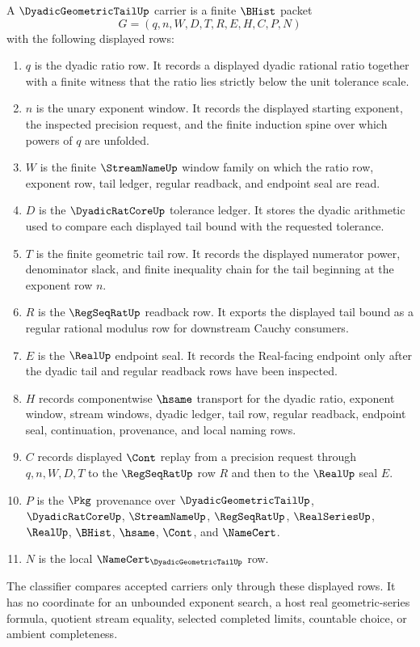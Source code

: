 \begin{definition}
\label{def:dyadic-geometric-tail-carrier}
A $\DyadicGeometricTailUp$ carrier is a finite $\BHist$ packet
$$
G=(q,n,W,D,T,R,E,H,C,P,N)
$$
with the following displayed rows:
\begin{enumerate}
\item $q$ is the dyadic ratio row. It records a displayed dyadic rational ratio together with a finite witness that the ratio lies strictly below the unit tolerance scale.
\item $n$ is the unary exponent window. It records the displayed starting exponent, the inspected precision request, and the finite induction spine over which powers of $q$ are unfolded.
\item $W$ is the finite $\StreamNameUp$ window family on which the ratio row, exponent row, tail ledger, regular readback, and endpoint seal are read.
\item $D$ is the $\DyadicRatCoreUp$ tolerance ledger. It stores the dyadic arithmetic used to compare each displayed tail bound with the requested tolerance.
\item $T$ is the finite geometric tail row. It records the displayed numerator power, denominator slack, and finite inequality chain for the tail beginning at the exponent row $n$.
\item $R$ is the $\RegSeqRatUp$ readback row. It exports the displayed tail bound as a regular rational modulus row for downstream Cauchy consumers.
\item $E$ is the $\RealUp$ endpoint seal. It records the Real-facing endpoint only after the dyadic tail and regular readback rows have been inspected.
\item $H$ records componentwise $\hsame$ transport for the dyadic ratio, exponent window, stream windows, dyadic ledger, tail row, regular readback, endpoint seal, continuation, provenance, and local naming rows.
\item $C$ records displayed $\Cont$ replay from a precision request through $q,n,W,D,T$ to the $\RegSeqRatUp$ row $R$ and then to the $\RealUp$ seal $E$.
\item $P$ is the $\Pkg$ provenance over $\DyadicGeometricTailUp$, $\DyadicRatCoreUp$, $\StreamNameUp$, $\RegSeqRatUp$, $\RealSeriesUp$, $\RealUp$, $\BHist$, $\hsame$, $\Cont$, and $\NameCert$.
\item $N$ is the local $\NameCert_{\DyadicGeometricTailUp}$ row.
\end{enumerate}
The classifier compares accepted carriers only through these displayed rows. It has no coordinate for an unbounded exponent search, a host real geometric-series formula, quotient stream equality, selected completed limits, countable choice, or ambient completeness.
\end{definition}

